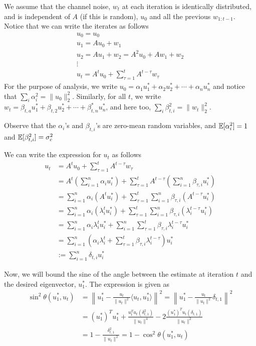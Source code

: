 \documentclass[10pt]{article}
\newcommand{\norm}[1]{\left\|#1\right\|}
\begin{document}
We assume that the channel noise, $w_t$ at each iteration is identically distributed, and is independent of $A$ (if this is random), $u_0$ and all the previous $w_{1:t-1}$. Notice that we can write the iterates as follows
\begin{gather*}
u_0 = u_0 \\
u_1 = A u_0 + w_1 \\
u_2 = A u_1 + w_2 = A^2 u_0 + A w_1 + w_2\\
\vdots \\
u_t = A^t u_0 + \sum_{\tau = 1}^t A^{t-\tau} w_\tau
\end{gather*}
For the purpose of analysis, we write $u_0 = \alpha_1 u_1^* + \alpha_2 u_2^* + \cdots + \alpha_n u_n^*$ and notice that $\sum_i \alpha_i^2 = \|u_0\|_2^2$. Similarly, for all $t$, we write $w_t = \beta_{t,a} u_1^* + \beta_{t,2} u_2^* +  \cdots + \beta_{t,n}^* u_n^*$, and here too, $\sum_i \beta_{t,i}^2 = \|w_t\|_2^2$. 

Observe that the $\alpha_i$'s and $\beta_{t,i}$'s are zero-mean random variables, and $\mathbb{E}[\alpha_i^2] = 1$ and $\mathbb{E}[\beta_{t,i}^2] = \sigma_c^2$

We can write the expression for $u_t$ as follows
\begin{align*}
u_t &= A^t u_0 + \sum_{\tau=1}^t A^{t - \tau} w_\tau \\
&= A^t \left( \sum_{i=1}^n \alpha_i u_i^* \right) + \sum_{\tau=1}^t A^{t - \tau} \left( \sum_{i=1}^n \beta_{\tau,i} u_i^* \right) \\
&= \sum_{i=1}^n \alpha_i (A^t u_i^*)  + \sum_{\tau=1}^t \sum_{i=1}^n \beta_{\tau,i} (A^{t - \tau} u_i^*)  \\
&= \sum_{i=1}^n \alpha_i (\lambda_i^t u_i^*)  + \sum_{\tau=1}^t \sum_{i=1}^n \beta_{\tau,i} (\lambda_i^{t - \tau} u_i^*)  \\
&= \sum_{i=1}^n \alpha_i \lambda_i^t u_i^*  + \sum_{i=1}^n \sum_{\tau=1}^t  \beta_{\tau,i} \lambda_i^{t - \tau} u_i^*  \\
&= \sum_{i=1}^n \left(\alpha_i \lambda_i^t + \sum_{\tau=1}^t  \beta_{\tau,i} \lambda_i^{t - \tau}\right) u_i^*  \\
&:= \sum_{i=1}^n \delta_{t,i}  u_i^*
\end{align*}



Now, we will bound the sine of the angle between the estimate at iteration $t$ and the desired eigenvector, $u_1^*$. The expression is given as 
\begin{align*}
\sin^2\theta(u_1^*, u_t) &= \norm{u_1^* - \frac{u_t}{\|u_t\|^2} \langle u_t, u_1^*\rangle}^2 = \norm{u_1^* - \frac{u_t}{\|u_t\|^2} \delta_{t,1}}^2 \\
&= (u_1^*)^Tu_1^* + \frac{u_t^T u_t (\delta_{t,1}^2)}{\|u_t\|^4} - 2 \frac{(u_1^*)^T u_t (\delta_{t,1})}{\|u_t\|^2 } \\
&= 1 - \frac{\delta_{t,1}^2}{\|u_t\|^2} = 1 - \cos^2\theta(u_1^*, u_t)
\end{align*}
\end{document}
